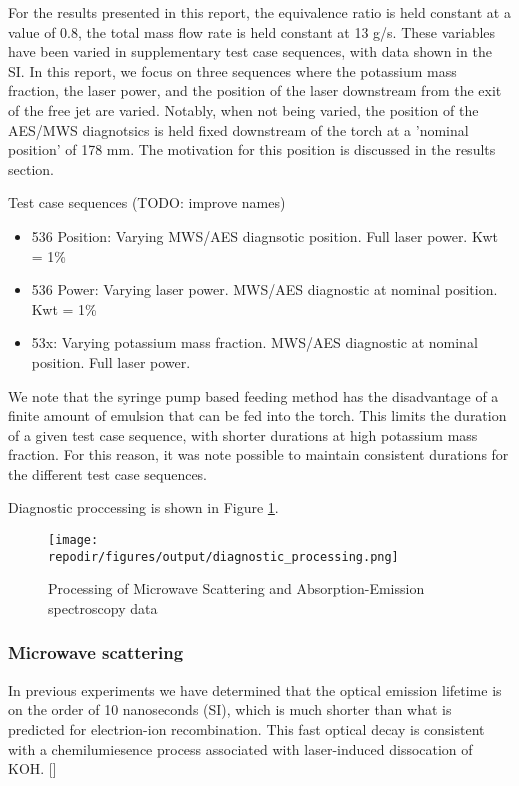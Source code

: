 For the results presented in this report, the equivalence ratio is held constant at a value of 0.8, the total mass flow rate is held constant at 13 g/s. These variables have been varied in supplementary test case sequences, with data shown in the SI. In this report, we focus on three sequences where the potassium mass fraction, the laser power, and the position of the laser downstream from the exit of the free jet are varied. Notably, when not being varied, the position of the AES/MWS diagnotsics is held fixed downstream of the torch at a 'nominal position' of 178 mm. The motivation for this position is discussed in the results section. 

Test case sequences (TODO: improve names)
\begin{itemize}
    \item 536 Position: Varying MWS/AES diagnsotic position. Full laser power. Kwt = 1\%
    \item 536 Power: Varying laser power. MWS/AES diagnostic at nominal position. Kwt = 1\%
    \item 53x: Varying potassium mass fraction. MWS/AES diagnostic at nominal position. Full laser power.
\end{itemize}



We note that the syringe pump based feeding method has the disadvantage of a finite amount of emulsion that can be fed into the torch. This limits the duration of a given test case sequence, with shorter durations at high potassium mass fraction. For this reason, it was note possible to maintain consistent durations for the different test case sequences.


Diagnostic proccessing is shown in Figure \ref{fig:diagnostic_processing}.

\begin{figure}[h]
    \texttt{[image: \\repodir/figures/output/diagnostic\_processing.png]} 
    \caption{Processing of Microwave Scattering and Absorption-Emission spectroscopy data}
    \label{fig:diagnostic_processing}
\end{figure}


\subsubsection{Microwave scattering}

 In previous experiments we have determined that the optical emission lifetime is on the order of 10 nanoseconds (SI), which is much shorter than what is predicted for electrion-ion recombination. This fast optical decay is consistent with a chemilumiesence process associated with laser-induced dissocation of KOH. [] 

